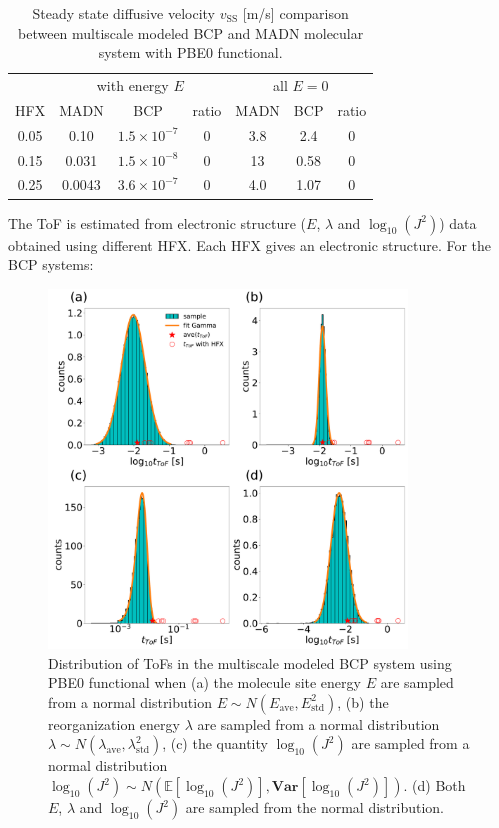 \documentclass[letterpaper,12pt]{article}
\begin{document}
\begin{table}[htbp]
\centering
\begin{tabular}{c c c c c c c}
    \toprule
        &
        \multicolumn{3}{c}{ with energy $E$} &
        \multicolumn{3}{c}{all $E=0$}  \\
    HFX & MADN & BCP & ratio & MADN & BCP & ratio  \\
    \cmidrule(r){1-7}
    0.05 & 0.10 & $1.5 \times 10^{-7}$ & 0 & 3.8 & 2.4 & 0 \\
    0.15 & 0.031 & $1.5 \times 10^{-8}$ & 0 & 13 & 0.58 & 0 \\
    0.25 & 0.0043 & $3.6 \times 10^{-7}$ & 0 & 4.0 & 1.07 & 0 \\
    \bottomrule
    \end{tabular}
    \caption{Steady state diffusive velocity $v_\text{SS}$ [m/s] comparison between multiscale modeled BCP and MADN molecular system with PBE0 functional. }
\end{table}

The ToF is estimated from electronic structure ($E$, $\lambda$ and $\log_{10}(J^2)$) data obtained using different HFX. Each HFX gives an electronic structure. 
For the BCP systems:
\begin{figure}[H]
    \centering
    \includegraphics[width=0.85\textwidth]{figs/BCP_HFX/fig_mle_BCP_withE.pdf}
    \caption{Distribution of ToFs in the multiscale modeled BCP system using PBE0 functional when (a) the molecule site energy $E$ are sampled from a normal distribution $E \sim N(E_\text{ave},E^2_\text{std})$, (b) the reorganization energy $\lambda$ are sampled from a normal distribution $\lambda \sim N(\lambda_\text{ave},\lambda^2_\text{std})$, (c) the quantity $\log_{10}(J^2)$ are sampled from a normal distribution $\log_{10}(J^2) \sim N(\mathbb{E}[\log_{10}(J^2)], \textbf{Var}[\log_{10}(J^2)] )$. (d) Both $E$, $\lambda$ and $\log_{10}(J^2)$ are sampled from the normal distribution. }
    \label{fig:mle_BCP_withE}
\end{figure}
\end{document}
